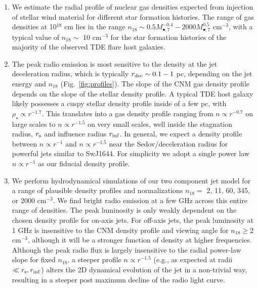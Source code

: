\documentclass[usenatbib,fleqn]{mnras}
\newcommand{\Mbh}[1][]{M_{\bullet#1}}
\begin{document}
\begin{enumerate}
\item We estimate the radial profile of nuclear gas densities expected
  from injection of stellar wind material for different star formation
  histories.  The range of gas densities at 10$^{18}$ cm lies in the
  range $n_{18} \sim 0.5 \Mbh[,7]^{-0.4} - 2000 \Mbh[,7]^{0.5}$
  cm$^{-3}$, with a typical value of $n_{18} \sim$ 10 cm$^{-3}$ for
  the star formation histories of the majority of the observed TDE
  flare host galaxies.

\item The peak radio emission is most sensitive to the density at the
  jet deceleration radius, which is typically $r_{\rm dec} \sim 0.1-1$
  pc, depending on the jet energy and $n_{18}$
  (Fig.~\ref{fig:profiles}).  The slope of the CNM gas density profile
  depends on the slope of the stellar density profile.  A typical TDE
  host galaxy likely possesses a cuspy stellar density profile inside
  of a few pc, with $\rho_\star \propto r^{-1.7}$. This translates
  into a gas density profile ranging from $n \propto r^{-0.7}$ on
  large scales to $n\propto r^{-1.5}$ on very small scales, well
  inside the stagnation radius, $r_{\rm s}$ and influence radius
  $r_{\rm inf}$. In general, we expect a density profile between
  $n\propto r^{-1}$ and $n\propto r^{-1.5}$ near the
  Sedov/deceleration radius for powerful jets similar to SwJ1644. For
  simplicity we adopt a single power law $n\propto r^{-1}$ as our
  fiducial density profile.


\item We perform hydrodynamical simulations of our two component jet
  model for a range of plausible density profiles and normalizations
  $n_{18} = $ 2, 11, 60, 345, or 2000 cm$^{-3}$. We find bright radio
  emission at a few GHz across this entire range of densities. The
  peak luminosity is only weakly dependent on the chosen density
  profile for on-axis jets. For off-axis jets, the peak luminosity at
  1 GHz is insensitive to the CNM density profile and viewing angle
  for $n_{18}\geq 2$ cm$^{-3}$, although it will be a stronger
  function of density at higher frequencies.  Although the peak radio
  flux is largely insensitive to the radial power-law slope for fixed
  $n_{18}$, a steeper profile $n\propto r^{-1.5}$ (e.g., as expected
  at radii $\ll r_{\rm s}, r_{\rm inf}$) alters the 2D dynamical
  evolution of the jet in a non-trivial way, resulting in a steeper
  post maximum decline of the radio light curve.


\end{enumerate}
\end{document}
